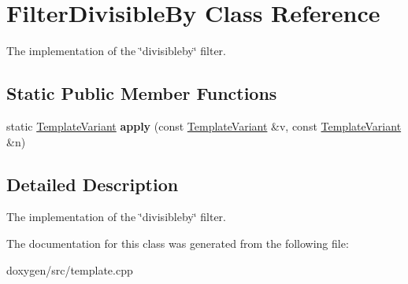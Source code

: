 \hypertarget{class_filter_divisible_by}{}\section{Filter\+Divisible\+By Class Reference}
\label{class_filter_divisible_by}


The implementation of the \char`\"{}divisibleby\char`\"{} filter.  


\subsection*{Static Public Member Functions}
\begin{DoxyCompactItemize}
\item 
\mbox{\label{class_filter_divisible_by_a9bfbda95f0c6d8913875a4082fb6fab2}} 
static \mbox{\hyperlink{class_template_variant}{Template\+Variant}} {\bfseries apply} (const \mbox{\hyperlink{class_template_variant}{Template\+Variant}} \&v, const \mbox{\hyperlink{class_template_variant}{Template\+Variant}} \&n)
\end{DoxyCompactItemize}


\subsection{Detailed Description}
The implementation of the \char`\"{}divisibleby\char`\"{} filter. 

The documentation for this class was generated from the following file\+:\begin{DoxyCompactItemize}
\item 
doxygen/src/template.\+cpp\end{DoxyCompactItemize}
